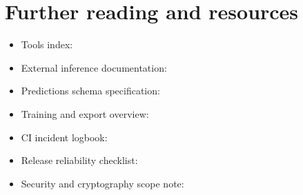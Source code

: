 \section{Further reading and resources}
\begin{itemize}
  \item Tools index: 
  \item External inference documentation: 
  \item Predictions schema specification: 
  \item Training and export overview: 
  \item CI incident logbook: 
  \item Release reliability checklist: 
  \item Security and cryptography scope note: 
\end{itemize}
